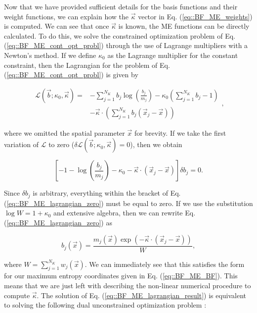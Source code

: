 Now that we have provided sufficient details for the basis functions and their weight functions, we can explain how the $\vec{\kappa}$ vector in Eq. (\ref{eq::BF_ME_weights}) is computed. We can see that once $\vec{\kappa}$ is known, the ME functions can be directly calculated. To do this, we solve the constrained optimization problem of Eq. (\ref{eq::BF_ME_cont_opt_probl}) through the use of Lagrange multipliers with a Newton's method. If we define $\kappa_0$ as the Lagrange multiplier for the constant constraint, then the Lagrangian for the problem of Eq. (\ref{eq::BF_ME_cont_opt_probl}) is given by

\begin{equation}
\label{eq::BF_ME_lagrangian}
\begin{aligned}
\mathcal{L} (\vec{b}; \kappa_0, \vec{\kappa} ) = &- \sum_{j=1}^{N_K} b_j \log \left(  \frac{b_j}{m_j} \right) - \kappa_0 \left(  \sum_{j=1}^{N_K} b_j - 1 \right) \\
&- \vec{\kappa} \cdot \left(  \sum_{j=1}^{N_K} b_j \left( \vec{x}_j - \vec{x} \right) \right)
\end{aligned} ,
\end{equation}

\noindent where we omitted the spatial parameter $\vec{x}$ for brevity. If we take the first variation of $\mathcal{L}$ to zero ($\delta \mathcal{L} (\vec{b}; \kappa_0, \vec{\kappa} ) = 0$), then we obtain

\begin{equation}
\label{eq::BF_ME_lagrangian_zero}
\left[ -1 - \log \left(  \frac{b_j}{m_j} \right) - \kappa_0 - \vec{\kappa} \cdot \left( \vec{x}_j - \vec{x} \right)  \right] \delta b_j = 0 .
\end{equation}

\noindent Since $\delta b_j $ is arbitrary, everything within the bracket of Eq. (\ref{eq::BF_ME_lagrangian_zero}) must be equal to zero. If we use the substitution $\log W= 1 + \kappa_0$ and extensive algebra, then we can rewrite Eq. (\ref{eq::BF_ME_lagrangian_zero}) as

\begin{equation}
\label{eq::BF_ME_lagrangian_result}
b_j (\vec{x}) = \frac{m_j(\vec{x}) \exp(-  \vec{\kappa} \cdot (\vec{x}_j - \vec{x}))}{W} ,
\end{equation}

\noindent where $W = \sum\limits_{j=1}^{N_K} w_j (\vec{x})$. We can immediately see that this satisfies the form for our maximum entropy coordinates given in Eq. (\ref{eq::BF_ME_BF}). This means that we are just left with describing the non-linear numerical procedure to compute $\vec{\kappa}$. The solution of Eq. (\ref{eq::BF_ME_lagrangian_result}) is equivalent to solving the following dual unconstrained optimization problem \cite{boyd2004convex}:

